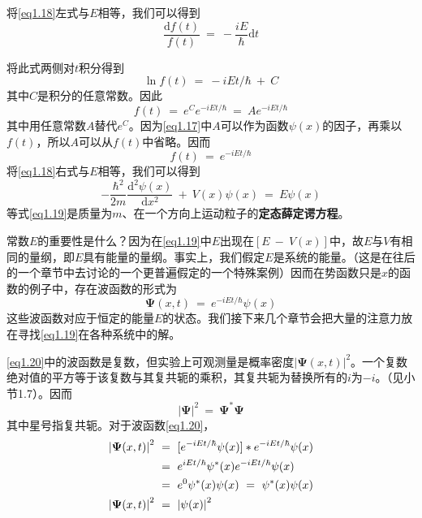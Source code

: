 \documentclass[12pt,a4paper,openany]{ctexbook}
\begin{document}
\begin{flushleft}
将\eqref{eq1.18}左式与$E$相等，我们可以得到
\begin{equation*}
    \frac{\mathrm{d}f(t)}{f(t)}\ =\ -\frac{iE}{\hbar}\mathrm{d}t
\end{equation*}

将此式两侧对$t$积分得到
\begin{equation*}
    \ln f(t)\ =\ -iEt/\hbar\ +\ C
\end{equation*}
其中$C$是积分的任意常数。因此
\begin{equation*}
    f(t)\ =\ e^Ce^{-iEt/\hbar}\ =\ Ae^{-iEt/\hbar}
\end{equation*}
其中用任意常数$A$替代$e^C$。因为\eqref{eq1.17}中$A$可以作为函数$\psi(x)$的因子，再乘以$f(t)$，所以$A$可以从$f(t)$中省略。因而
\begin{equation*}
    f(t)\ =\ e^{-iEt/\hbar}
\end{equation*}
将\eqref{eq1.18}右式与$E$相等，我们可以得到
\begin{equation}
    -\frac{\hbar^2}{2m}\frac{\mathrm{d}^2\psi(x)}{\mathrm{d}x^2}\ +\ V(x)\psi(x)\ =\ E\psi(x)
    \label{eq1.19}
\end{equation}
等式\eqref{eq1.19}是质量为$m$、在一个方向上运动粒子的\textbf{定态薛定谔方程}。

常数$E$的重要性是什么？因为在\eqref{eq1.19}中$E$出现在$[E\ -\ V(x)]$中，故$E$与$V$有相同的量纲，即$E$具有能量的量纲。事实上，我们假定$E$是系统的能量。（这是在往后的一个章节中去讨论的一个更普遍假定的一个特殊案例）因而在势函数只是$x$的函数的例子中，存在波函数的形式为
\begin{equation}
    \bm{\Psi}(x,t)\ =\ e^{-iEt/\hbar}\psi(x)
    \label{eq1.20}
\end{equation}
这些波函数对应于恒定的能量$E$的状态。我们接下来几个章节会把大量的注意力放在寻找\eqref{eq1.19}在各种系统中的解。

\eqref{eq1.20}中的波函数是复数，但实验上可观测量是概率密度$\left|\bm{\Psi}(x,t)\right|^2$。一个复数绝对值的平方等于该复数与其复共轭的乘积，其复共轭为替换所有的$i$为$-i$。（见小节1.7）。因而
\begin{equation}
   \boxed{\left|\bm{\Psi}\right|^2\ =\ \bm{\Psi}^*\bm{\Psi}} 
\end{equation}
其中星号指复共轭。对于波函数\eqref{eq1.20}，
\begin{align}
    \left|\bm{\Psi}(x,t)\right|^2\ &=\ [e^{-iEt/\hbar}\psi(x)]*e^{-iEt/\hbar}\psi(x) \notag \\
    &=\ e^{iEt/\hbar}\psi^*(x)e^{-iEt/\hbar}\psi(x) \notag \\
    &=\ e^0\psi^*(x)\psi(x)\ =\ \psi^*(x)\psi(x) \notag \\
    \left|\bm{\Psi}(x,t)\right|^2\ &=\ \left|\psi(x)\right|^2
    \label{eq1.22}
\end{align}


\end{flushleft}
\end{document}
